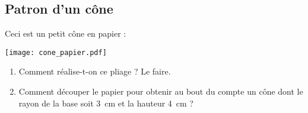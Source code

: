 
\subsection*{Patron d'un cône}

Ceci est un petit cône en papier :
\begin{center}
    \texttt{[image: cone\_papier.pdf]}
\end{center}

\begin{enumerate}
    \item
        Comment réalise-t-on ce pliage ? Le faire.
    \item
        Comment découper le papier pour obtenir au bout du compte un cône dont le rayon de la base soit \SI{3}{\centi\meter} et la hauteur \SI{4}{\centi\meter} ?
\end{enumerate}
